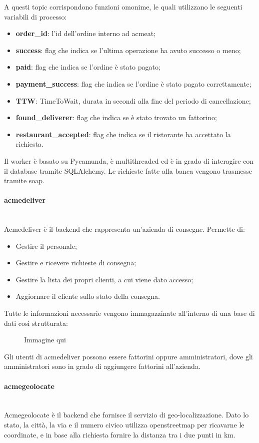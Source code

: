\documentclass[11pt]{article} %
\begin{document}
A questi topic corrispondono funzioni omonime, le quali utilizzano le seguenti variabili di processo:
\begin{itemize}
\item \textbf{order\_id}: l'id dell'ordine interno ad acmeat;
\item \textbf{success}: flag che indica se l'ultima operazione ha avuto successo o meno;
\item \textbf{paid}: flag che indica se l'ordine è stato pagato;
\item \textbf{payment\_success}: flag che indica se l'ordine è stato pagato correttamente;
\item \textbf{TTW}: TimeToWait, durata in secondi alla fine del periodo di cancellazione;
\item \textbf{found\_deliverer}: flag che indica se è stato trovato un fattorino;
\item \textbf{restaurant\_accepted}: flag che indica se il ristorante ha accettato la richiesta.
\end{itemize}
Il worker è basato su Pycamunda, è multithreaded ed è in grado di interagire con il database tramite SQLAlchemy. Le richieste fatte alla banca vengono trasmesse tramite soap.

\paragraph{acmedeliver}\mbox{}\\
Acmedeliver è il backend che rappresenta un'azienda di consegne. Permette di:
\begin{itemize}
\item Gestire il personale;
\item Gestire e ricevere richieste di consegna;
\item Gestire la lista dei propri clienti, a cui viene dato accesso;
\item Aggiornare il cliente sullo stato della consegna.
\end{itemize}
Tutte le informazioni necessarie vengono immagazzinate all'interno di una base di dati così strutturata:
\begin{figure}
Immagine qui
\end{figure}
Gli utenti di acmedeliver possono essere fattorini oppure amministratori, dove gli amministratori sono in grado di aggiungere fattorini all'azienda.

\paragraph{acmegeolocate}\mbox{}\\
Acmegeolocate è il backend che fornisce il servizio di geo-localizzazione. Dato lo stato, la città, la via e il numero civico utilizza openstreetmap per ricavarne le coordinate, e in base alla richiesta fornire la distanza tra i due punti in km.
\end{document}
